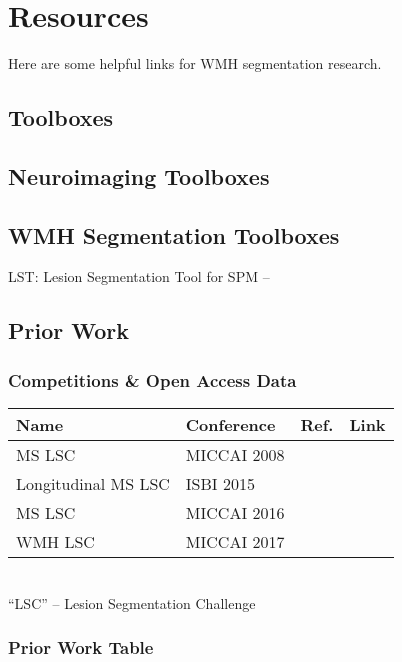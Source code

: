 \chapter{Resources}
Here are some helpful links for WMH segmentation research.
\section{Toolboxes}

\section{Neuroimaging Toolboxes}

\section{WMH Segmentation Toolboxes}
LST: Lesion Segmentation Tool \cite{Schmidt2012,Schmidt2015} for SPM -- 

\section{Prior Work}
\subsection{Competitions \& Open Access Data}
\begin{tabu} to \textwidth {llcl}
	Name                & Conference  &       Ref.        & Link                                                     \\ \hline
	MS LSC              & MICCAI 2008 & \cite{MSSEG2008}  &                     \\
	Longitudinal MS LSC & ISBI 2015   & \cite{MSISBI2015} &    \\
	MS LSC              & MICCAI 2016 & \cite{MSSEG2016}  &  \\
	WMH LSC             & MICCAI 2017 & \cite{WMHSEG2017} &                            \\ \hline
\end{tabu}\\
``LSC'' -- Lesion Segmentation Challenge
\subsection{Prior Work Table}

